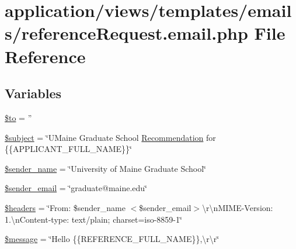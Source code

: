 \hypertarget{reference_request_8email_8php}{\section{application/views/templates/emails/reference\-Request.email.\-php File Reference}
\label{reference_request_8email_8php}
}
\subsection*{Variables}
\begin{DoxyCompactItemize}
\item 
\hyperlink{reference_request_8email_8php_ac19f839b525d6d99d063fe56bf2a6d3b}{\$to} = ''
\item 
\hyperlink{reference_request_8email_8php_afea90503726cd5ad2eb80baf0b6d217d}{\$subject} = \char`\"{}U\-Maine Graduate School \hyperlink{class_recommendation}{Recommendation} for \{\{A\-P\-P\-L\-I\-C\-A\-N\-T\-\_\-\-F\-U\-L\-L\-\_\-\-N\-A\-M\-E\}\}\char`\"{}
\item 
\hyperlink{reference_request_8email_8php_a764139b835e0e51ceb5518c72938995e}{\$sender\-\_\-name} = \char`\"{}University of Maine Graduate School\char`\"{}
\item 
\hyperlink{reference_request_8email_8php_aa1dd1e27206dc4fd57800391ff4bb7de}{\$sender\-\_\-email} = \char`\"{}graduate@maine.\-edu\char`\"{}
\item 
\hyperlink{reference_request_8email_8php_a52500036ee807241b8b4b7e2367c49ef}{\$headers} = \char`\"{}From\-: \$sender\-\_\-name $<$\$sender\-\_\-email$>$\textbackslash{}r\textbackslash{}n\-M\-I\-M\-E-\/Version\-: 1.\textbackslash{}n\-Content-\/type\-: text/plain; charset=iso-\/8859-\/1\char`\"{}
\item 
\hyperlink{reference_request_8email_8php_abf17cb2dba2ed17cb28aa5f37deb5293}{\$message} = \char`\"{}Hello \{\{R\-E\-F\-E\-R\-E\-N\-C\-E\-\_\-\-F\-U\-L\-L\-\_\-\-N\-A\-M\-E\}\},\textbackslash{}r\textbackslash{}r\char`\"{}
\end{DoxyCompactItemize}


